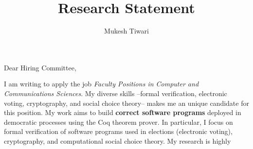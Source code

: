 \documentclass[a4paper]{article}
\title{Research Statement}
\author{Mukesh Tiwari}
\date{}
\begin{document}
\fontsize{12}{15}
\selectfont
\maketitle

Dear Hiring Committee, 

I am writing to apply the job \textit{Faculty Positions in Computer and Communications 
Sciences}. My diverse skills --formal verification, electronic voting, cryptography, 
and social choice theory-- makes me an unique candidate for this position.  
My work aims to build \textbf{correct software programs} deployed in democratic processes 
using the Coq theorem prover. In particular, I focus on formal verification of 
software programs used in elections (electronic voting), cryptography, and computational social choice theory. 
My research is highly 
\end{document}
